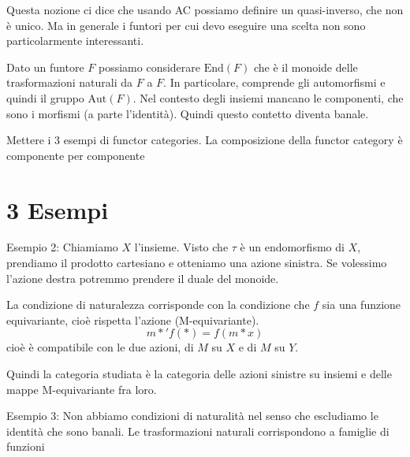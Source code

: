 \documentclass[a4paper]{article}
\begin{document}
Questa nozione ci dice che usando AC possiamo definire un quasi-inverso,
che non è unico. Ma in generale i funtori per cui devo eseguire una scelta non sono
particolarmente interessanti.


Dato un funtore \(F\) possiamo considerare \(\text{End}(F)\)
che è il monoide delle trasformazioni naturali da \(F\) a \(F\).
In particolare, comprende gli automorfismi e quindi il gruppo
\(\text{Aut}(F)\). Nel contesto degli insiemi mancano
le componenti, che sono i morfismi (a parte l'identità).
Quindi questo contetto diventa banale.

Mettere i 3 esempi di functor categories.
La composizione della functor category è componente per componente


\section{3 Esempi}

Esempio 2:
Chiamiamo \(X\) l'insieme.
Visto che \(\tau\) è un endomorfismo di \(X\), prendiamo il prodotto
cartesiano e otteniamo una azione sinistra.
Se volessimo l'azione destra potremmo prendere il duale del monoide.

La condizione di naturalezza corrisponde con
la condizione che \(f\) sia una funzione equivariante, cioè rispetta
l'azione (M-equivariante).
\[
    m \ast' f(\ast) = f(m \ast x)
\]
cioè è compatibile con le due azioni,
di \(M\) su \(X\) e di \(M\) su \(Y\).

Quindi la categoria studiata è la categoria delle azioni sinistre
su insiemi e delle mappe M-equivariante fra loro.

Esempio 3:
Non abbiamo condizioni di naturalità nel senso che escludiamo
le identità che sono banali.
Le trasformazioni naturali corrispondono a famiglie
di funzioni
\end{document}

